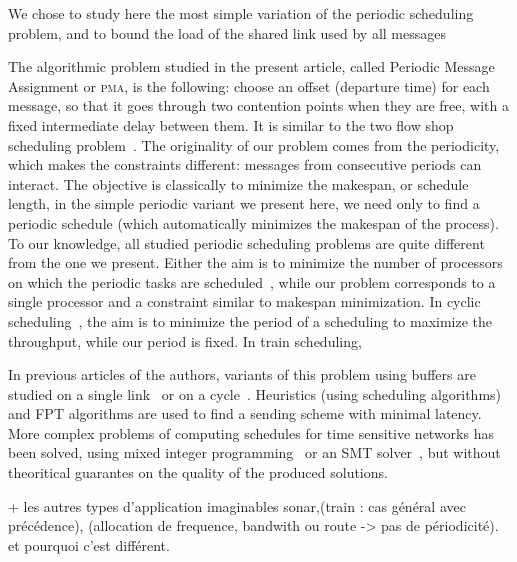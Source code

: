 \documentclass[10pt, conference, letterpaper]{IEEEtran}
\newcommand\pma{\textsc{pma}\xspace}
\begin{document}
We chose to study here the most simple variation of the periodic scheduling problem, 
and to bound the load of the shared link used by all messages 

The algorithmic problem studied in the present article, called Periodic Message Assignment or \pma, is the following: choose an offset (departure time) for each message, so that it goes through two contention points when they are free, with a fixed intermediate delay between them. It is  similar to the two flow shop scheduling problem~\cite{yu2004minimizing}. The originality of our problem comes from the periodicity, which makes the constraints different: messages from consecutive periods can interact. The objective is classically to minimize the makespan, or schedule length, in the simple periodic variant we present here, we need only to find a periodic schedule (which automatically minimizes the makespan of the process). 
 To our knowledge, all studied periodic scheduling problems are quite different from the one we present.
Either the aim is to minimize the number of processors on which the periodic tasks are scheduled~\cite{korst1991periodic,hanen1993cyclic}, while our problem corresponds to a single processor and a constraint similar to makespan minimization. In cyclic scheduling~\cite{levner2010complexity}, the aim is to minimize the period of a scheduling to maximize the throughput, while our period is fixed. In train scheduling, 


In previous articles of the authors, variants of this problem using buffers are studied on a single link~\cite{dominique2018deterministic} or on a cycle~\cite{Guir1905:Deterministic}. Heuristics (using scheduling algorithms) and FPT algorithms are used to find a sending scheme with minimal latency. More complex problems of computing schedules for time sensitive networks has been solved, using mixed integer programming~\cite{nayak2017incremental,steiner2018traffic} or an SMT solver~\cite{dos2019tsnsched}, but without theoritical guarantes on the quality of the produced solutions. 

+ les autres types d'application imaginables sonar,(train : cas général avec précédence), (allocation de frequence, bandwith ou route -> pas de périodicité).
et pourquoi c'est différent. 
\end{document}
